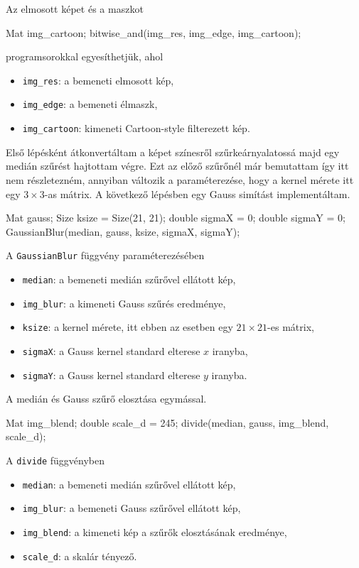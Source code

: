 Az elmosott képet és a maszkot 
\begin{cpp}
Mat img_cartoon;
bitwise_and(img_res, img_edge, img_cartoon);
\end{cpp}
programsorokkal egyesíthetjük, ahol
\begin{itemize}
    \item \texttt{img\_res}: a bemeneti elmosott kép,
    \item \texttt{img\_edge}: a bemeneti élmaszk,
    \item \texttt{img\_cartoon}: kimeneti Cartoon-style filterezett kép.
\end{itemize}


Első lépésként átkonvertáltam a képet színesről szűrkeárnyalatossá majd egy medián szűrést hajtottam végre. Ezt az előző szűrőnél már bemutattam így itt nem részletezném, annyiban változik a paraméterezése, hogy a kernel mérete itt egy $3 \times 3$-as mátrix.
A következő lépésben egy Gauss simítást implementáltam. 
\begin{cpp}
Mat gauss;
Size ksize = Size(21, 21);
double sigmaX = 0;
double sigmaY = 0;
GaussianBlur(median, gauss, ksize, sigmaX, sigmaY);
\end{cpp}
A \texttt{GaussianBlur} függvény paraméterezésében
\begin{itemize}
    \item \texttt{median}: a bemeneti medián szűrővel ellátott kép,
    \item \texttt{img\_blur}: a kimeneti Gauss szűrés eredménye,
    \item \texttt{ksize}: a kernel mérete, itt ebben az esetben egy $21 \times 21$-es mátrix,
    \item \texttt{sigmaX}: a Gauss kernel standard elterese $x$ iranyba,
    \item \texttt{sigmaY}: a Gauss kernel standard elterese $y$ iranyba.
\end{itemize}
A medián és Gauss szűrő elosztása egymással.
\begin{cpp}
Mat img_blend;
double scale_d = 245;
divide(median, gauss, img_blend, scale_d);   
\end{cpp}
A \texttt{divide} függvényben
\begin{itemize}
    \item \texttt{median}: a bemeneti medián szűrővel ellátott kép,
    \item \texttt{img\_blur}: a bemeneti Gauss szűrővel ellátott kép,
    \item \texttt{img\_blend}: a kimeneti kép a szűrők elosztásának eredménye,
    \item \texttt{scale\_d}: a skalár tényező.
\end{itemize}
